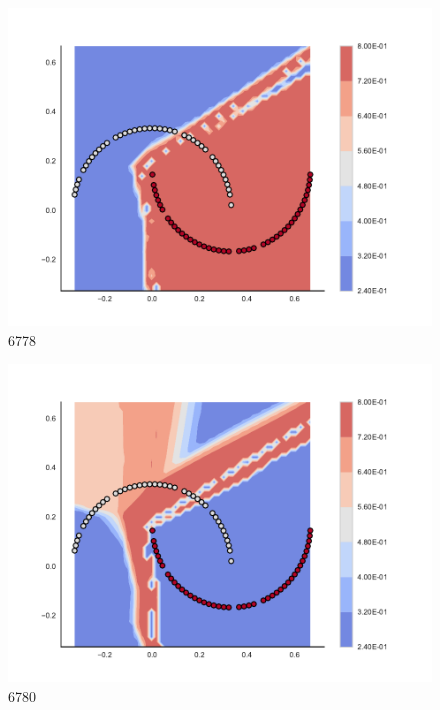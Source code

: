 \begin{subfigure}[b]{0.09\textwidth}
    \includegraphics[clip, trim=2.35cm 1.75cm 4.5cm 0cm,width=\textwidth]{img/convergence/6778.pdf}
    \caption{6778}
    \label{fig:convergence_6778}
\end{subfigure}
%
\begin{subfigure}[b]{0.09\textwidth}
    \includegraphics[clip, trim=2.35cm 1.75cm 4.5cm 0cm,width=\textwidth]{img/convergence/6780.pdf}
    \caption{6780}
    \label{fig:convergence_6780}
\end{subfigure}
%
